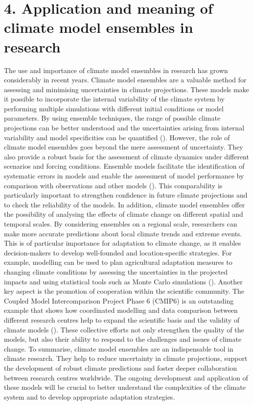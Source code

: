 \documentclass[
]{krantz}
\begin{document}
\section{4. Application and meaning of climate model ensembles in research}\label{application-and-meaning-of-climate-model-ensembles-in-research}

The use and importance of climate model ensembles in research has grown considerably in recent years. Climate model ensembles are a valuable method for assessing and minimising uncertainties in climate projections. These models make it possible to incorporate the internal variability of the climate system by performing multiple simulations with different initial conditions or model parameters. By using ensemble techniques, the range of possible climate projections can be better understood and the uncertainties arising from internal variability and model specificities can be quantified (\citet{deser}).
However, the role of climate model ensembles goes beyond the mere assessment of uncertainty. They also provide a robust basis for the assessment of climate dynamics under different scenarios and forcing conditions. Ensemble models facilitate the identification of systematic errors in models and enable the assessment of model performance by comparison with observations and other models (\citet{eyring2016overview}). This comparability is particularly important to strengthen confidence in future climate projections and to check the reliability of the models.
In addition, climate model ensembles offer the possibility of analysing the effects of climate change on different spatial and temporal scales. By considering ensembles on a regional scale, researchers can make more accurate predictions about local climate trends and extreme events. This is of particular importance for adaptation to climate change, as it enables decision-makers to develop well-founded and location-specific strategies. For example, modelling can be used to plan agricultural adaptation measures to changing climate conditions by assessing the uncertainties in the projected impacts and using statistical tools such as Monte Carlo simulations (\citet{falloon2014ensembles}).
Another key aspect is the promotion of cooperation within the scientific community. The Coupled Model Intercomparison Project Phase 6 (CMIP6) is an outstanding example that shows how coordinated modelling and data comparison between different research centres help to expand the scientific basis and the validity of climate models (\citet{eyring2016overview}). These collective efforts not only strengthen the quality of the models, but also their ability to respond to the challenges and issues of climate change.
To summarise, climate model ensembles are an indispensable tool in climate research. They help to reduce uncertainty in climate projections, support the development of robust climate predictions and foster deeper collaboration between research centres worldwide. The ongoing development and application of these models will be crucial to better understand the complexities of the climate system and to develop appropriate adaptation strategies.
\end{document}
